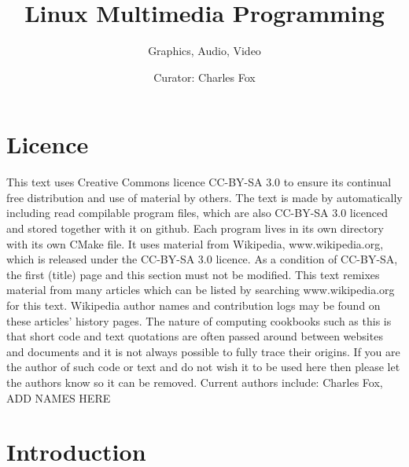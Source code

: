 \documentclass[oneside,english]{scrbook}
\begin{document}
\title{Linux Multimedia Programming}
\author{Graphics, Audio, Video}
\date{Curator: Charles Fox}
\publishers{Licence: CC-BY-SA 3.0}
\maketitle

\chapter*{Licence}

This text uses Creative Commons licence CC-BY-SA 3.0 to ensure its continual free distribution and use of material by others. The text is made by automatically including read compilable program files, which are also CC-BY-SA 3.0 licenced and stored together with it on github. Each program lives in its own directory with its own CMake file.  It uses material from Wikipedia, www.wikipedia.org, which is released under the CC-BY-SA 3.0 licence. As a condition of CC-BY-SA, the first (title) page and this section must not be modified.  This text remixes material from many articles which can be listed by searching www.wikipedia.org for this text.  Wikipedia author names and contribution logs may be found on these articles' history pages.   The nature of computing cookbooks such as this is that short code and text quotations are often passed around between websites and documents and it is not always possible to fully trace their origins. If you are the author of such code or text and do not wish it to be used here then please let the authors know so it can be removed. 
Current authors include: Charles Fox, ADD NAMES HERE

\tableofcontents

\chapter{Introduction}
\end{document}
